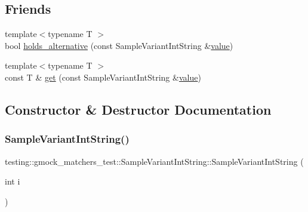\subsection*{Friends}
\begin{DoxyCompactItemize}
\item 
{\footnotesize template$<$typename T $>$ }\\bool \mbox{\hyperlink{classtesting_1_1gmock__matchers__test_1_1_sample_variant_int_string_a3139754402f0352ddea2ba7823ad16f1}{holds\+\_\+alternative}} (const Sample\+Variant\+Int\+String \&\mbox{\hyperlink{_obj__test_2lib_2googletest-master_2googlemock_2test_2gmock-matchers__test_8cc_a337b8a670efc0b086ad3af163f3121b6}{value}})
\item 
{\footnotesize template$<$typename T $>$ }\\const T \& \mbox{\hyperlink{classtesting_1_1gmock__matchers__test_1_1_sample_variant_int_string_a492b2fd643a25c4345f56c68369ebd54}{get}} (const Sample\+Variant\+Int\+String \&\mbox{\hyperlink{_obj__test_2lib_2googletest-master_2googlemock_2test_2gmock-matchers__test_8cc_a337b8a670efc0b086ad3af163f3121b6}{value}})
\end{DoxyCompactItemize}


\subsection{Constructor \& Destructor Documentation}
\mbox{\label{classtesting_1_1gmock__matchers__test_1_1_sample_variant_int_string_a362f135d65f8dd024202cc4908b510e2}} 
\subsubsection{\texorpdfstring{SampleVariantIntString()}{SampleVariantIntString()}\hspace{0.1cm}{\footnotesize\ttfamily [1/2]}}
{\footnotesize\ttfamily testing\+::gmock\+\_\+matchers\+\_\+test\+::\+Sample\+Variant\+Int\+String\+::\+Sample\+Variant\+Int\+String (\begin{DoxyParamCaption}\item[{int}]{i }\end{DoxyParamCaption})\hspace{0.3cm}{\ttfamily [inline]}}

